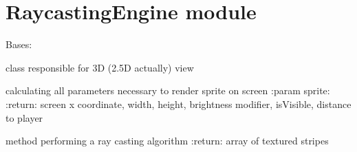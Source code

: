 \documentclass[letterpaper,10pt,english]{sphinxmanual}
\begin{document}
\sphinxstepscope


\section{RaycastingEngine module}
\label{\detokenize{RaycastingEngine:module-RaycastingEngine}}\label{\detokenize{RaycastingEngine:raycastingengine-module}}\label{\detokenize{RaycastingEngine::doc}}

\begin{fulllineitems}
\label{\detokenize{RaycastingEngine:RaycastingEngine.RaycastingEngine}}
\pysigstartsignatures
{}
\pysigstopsignatures
\sphinxAtStartPar
Bases: 

\sphinxAtStartPar
class responsible for 3D (2.5D actually) view

\begin{fulllineitems}
\label{\detokenize{RaycastingEngine:RaycastingEngine.RaycastingEngine.calculate_sprite_screen_parameters}}
\pysigstartsignatures
{}
\pysigstopsignatures
\sphinxAtStartPar
calculating all parameters necessary to render sprite on screen
:param sprite:
:return: screen x coordinate, width, height, brightness modifier, isVisible, distance to player

\end{fulllineitems}


\begin{fulllineitems}
\label{\detokenize{RaycastingEngine:RaycastingEngine.RaycastingEngine.cast_rays}}
\pysigstartsignatures
{}
\pysigstopsignatures
\sphinxAtStartPar
method performing a ray casting algorithm
:return: array of textured stripes


\end{fulllineitems}
\end{fulllineitems}
\end{document}
